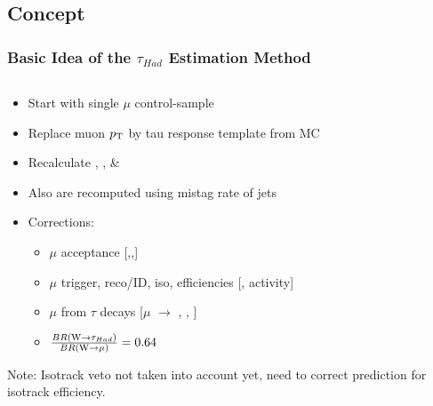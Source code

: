 \documentclass{beamer}
\begin{document}
\subsection{Concept}
\begin{frame}
 \frametitle{Basic Idea of the $\tau_{Had}$ Estimation Method}
 
    \begin{columns}
        \begin{column}{0.60\textwidth}
        \begin{itemize}
         \item Start with single $\mu$ control-sample
         \item Replace muon $p_{\text{T}}$ by tau response template from MC
         \item Recalculate \HT, \MHT, \NJets \& \met
         \item Also \BTags are recomputed using mistag rate of \hadtau jets
         \item Corrections:
         \begin{itemize}
          \item $\mu$ acceptance [\HT,\MHT,\NJets]
          \item $\mu$ trigger, reco/ID, iso, efficiencies [\pt, activity]
          \item $\mu$ from $\tau$ decays [$\mu$ \pt$\rightarrow$ \HT, \MHT, \NJets]
          \item $\frac{BR(\text{W}\rightarrow\tau_{Had})}{BR(\text{W}\rightarrow\mu)}=0.64$
         \end{itemize}

        \end{itemize}
        Note: Isotrack veto not taken into account yet, need to correct prediction for isotrack efficiency.
        

        
    

\end{column}
\end{columns}
\end{frame}
\end{document}
